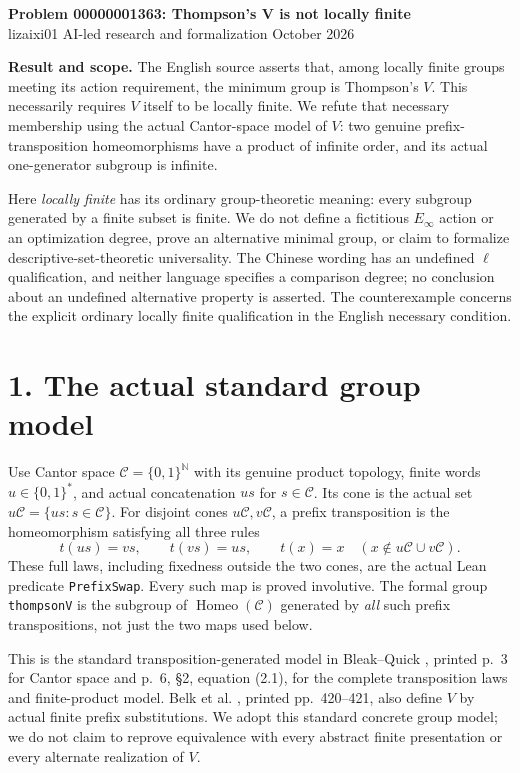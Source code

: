 \documentclass[10pt]{article}
\begin{document}
\begin{center}
{\Large\bfseries Problem 00000001363: Thompson's V is not locally finite}\\[5pt]
lizaixi01 \quad AI-led research and formalization  October 2026
\end{center}

\textbf{Result and scope.} The English source asserts that, among locally finite groups meeting its action requirement, the minimum group is Thompson's $V$. This necessarily requires $V$ itself to be locally finite. We refute that necessary membership using the actual Cantor-space model of $V$: two genuine prefix-transposition homeomorphisms have a product of infinite order, and its actual one-generator subgroup is infinite.

Here \emph{locally finite} has its ordinary group-theoretic meaning: every subgroup generated by a finite subset is finite. We do not define a fictitious $E_\infty$ action or an optimization degree, prove an alternative minimal group, or claim to formalize descriptive-set-theoretic universality. The Chinese wording has an undefined $\ell$ qualification, and neither language specifies a comparison degree; no conclusion about an undefined alternative property is asserted. The counterexample concerns the explicit ordinary locally finite qualification in the English necessary condition.

\section*{1. The actual standard group model}
Use Cantor space $\mathcal C=\{0,1\}^{\mathbb N}$ with its genuine product topology, finite words $u\in\{0,1\}^*$, and actual concatenation $us$ for $s\in\mathcal C$. Its cone is the actual set $u\mathcal C=\{us:s\in\mathcal C\}$. For disjoint cones $u\mathcal C,v\mathcal C$, a prefix transposition is the homeomorphism satisfying all three rules
\[
 t(us)=vs,\qquad t(vs)=us,\qquad
 t(x)=x\quad(x\notin u\mathcal C\cup v\mathcal C).
\]
These full laws, including fixedness outside the two cones, are the actual Lean predicate \texttt{PrefixSwap}. Every such map is proved involutive. The formal group \texttt{thompsonV} is the subgroup of $\operatorname{Homeo}(\mathcal C)$ generated by \emph{all} such prefix transpositions, not just the two maps used below.

This is the standard transposition-generated model in Bleak--Quick \cite{BQ}, printed p.~3 for Cantor space and p.~6, \S2, equation (2.1), for the complete transposition laws and finite-product model. Belk et al. \cite{BBQS}, printed pp.~420--421, also define $V$ by actual finite prefix substitutions. We adopt this standard concrete group model; we do not claim to reprove equivalence with every abstract finite presentation or every alternate realization of $V$.
\end{document}

